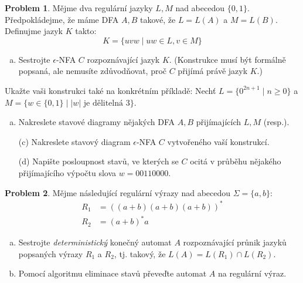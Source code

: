 \documentclass[a4paper,12pt]{article}
\theoremstyle{definition}
\newtheorem{problem}{Problem}
\begin{document}
\begin{problem}

    Mějme dva regulární jazyky $L,M$ nad abecedou $\{0,1\}$. Předpokládejme, že máme DFA $A,B$ takové, že $L=L(A)$ a $M=L(B)$. Definujme jazyk $K$ takto:
    $$K=\{uvw\mid uw\in L, v\in M\}$$
    
    \smallskip
    \begin{enumerate}[(a)]    
        \item Sestrojte $\epsilon$-NFA $C$ rozpoznávající jazyk $K$. 
        (Konstrukce musí být formálně popsaná, ale nemusíte zdůvodňovat, proč $C$ přijímá právě jazyk $K$.)
    \end{enumerate}
    Ukažte vaši konstrukci také na konkrétním příkladě: Nechť $L=\{0^{2n+1}\mid n\geq 0\}$ a $M=\{w\in\{0,1\}\mid |w|\text{ je dělitelná 3}\}$.    
    
    \smallskip
    \begin{enumerate}[(b)]
        \item Nakreslete stavové diagramy nějakých DFA $A,B$ přijímajících $L,M$ (resp.). 
        \item[(c)] Nakreslete stavový diagram $\epsilon$-NFA $C$ vytvořeného vaší konstrukcí.  
        \item[(d)] Napište posloupnost stavů, ve kterých se $C$ ocitá v průběhu nějakého přijímajícího výpočtu slova $w=00110000$.
    \end{enumerate}

\end{problem}


\bigskip


\begin{problem}

    Mějme následující regulární výrazy nad abecedou $\Sigma=\{a,b\}$:
    \begin{align*}
        R_1&=((a + b)(a + b)(a + b))^*\\
        R_2&=(a+b)^*a
    \end{align*}
    \begin{enumerate}[(a)]
        \item Sestrojte \emph{deterministický} konečný automat $A$ rozpoznávající průnik jazyků popsaných výrazy $R_1$ a $R_2$, tj. takový, že $L(A)= L(R_1) \cap L(R_2)$.
        \item Pomocí algoritmu eliminace stavů převeďte automat $A$ na regulární výraz.
    \end{enumerate}

\end{problem}
\end{document}
